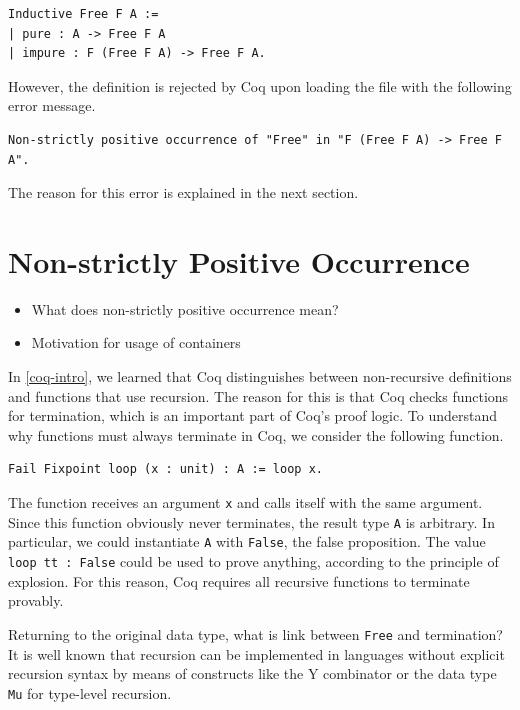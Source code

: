\documentclass[a4paper, 11pt, fleqn, twoside]{scrreprt}
\begin{document}
\begin{verbatim}
Inductive Free F A :=
| pure : A -> Free F A
| impure : F (Free F A) -> Free F A.
\end{verbatim}

However, the definition is rejected by Coq upon loading the file with the 
following error message.

\begin{verbatim}
Non-strictly positive occurrence of "Free" in "F (Free F A) -> Free F A".
\end{verbatim}

The reason for this error is explained in the next section.

\section{Non-strictly Positive Occurrence}
\begin{itemize}
\item What does non-strictly positive occurrence mean?
\item Motivation for usage of containers
\end{itemize}

In \autoref{coq-intro}, we learned that Coq distinguishes between 
non-recursive definitions and functions that use recursion. The reason for this 
is that Coq checks functions for termination, which is an important part of 
Coq's proof logic. To understand why functions must always terminate in Coq, we 
consider the following function.

\begin{verbatim}
Fail Fixpoint loop (x : unit) : A := loop x.
\end{verbatim}

The function receives an argument \texttt{x} and calls itself with the 
same argument. Since this function obviously never terminates, the result type 
\texttt{A} is arbitrary. In particular, we could instantiate 
\texttt{A} with \texttt{False}, the false proposition. The 
value \texttt{loop tt : False} could be used to prove anything,
according to the principle of explosion. For this reason, Coq requires all 
recursive functions to terminate provably.

Returning to the original data type, what is link between 
\texttt{Free} and termination? It is well known that recursion can be 
implemented in languages without explicit recursion syntax by means of 
constructs like the Y combinator or the data type \texttt{Mu} for 
type-level recursion.
\end{document}
